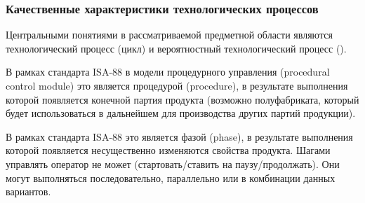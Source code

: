 \subsubsection{Качественные характеристики технологических процессов}

Центральными понятиями в рассматриваемой предметной области являются технологический процесс (цикл) и вероятностный технологический процесс ().

\begin{SCn}
\end{SCn}

В рамках стандарта ISA-88 в модели процедурного управления (procedural control module) это является процедурой (procedure), в результате выполнения которой появляется конечной партия продукта (возможно полуфабриката, который будет использоваться в дальнейшем для производства других партий продукции). 

\begin{SCn}
\end{SCn}

\begin{SCn}
\end{SCn}

В рамках стандарта ISA-88 это является фазой (phase), в результате выполнения которой появляется несущественно изменяются свойства продукта. Шагами управлять оператор не может (стартовать/ставить на паузу/продолжать). Они могут выполняться последовательно, параллельно или в комбинации данных вариантов.


